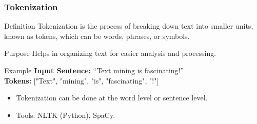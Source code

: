 \documentclass[aspectratio=169]{beamer}
\begin{document}
\begin{frame}[fragile]
    \frametitle{Tokenization}
    \begin{block}{Definition}
        Tokenization is the process of breaking down text into smaller units, known as tokens, which can be words, phrases, or symbols.
    \end{block}
    
    \begin{block}{Purpose}
        Helps in organizing text for easier analysis and processing.
    \end{block}
    
    \begin{block}{Example}
        \textbf{Input Sentence:} “Text mining is fascinating!” \\
        \textbf{Tokens:} ["Text", "mining", "is", "fascinating", "!"]
    \end{block}
    
    \begin{itemize}
        \item Tokenization can be done at the word level or sentence level.
        \item Tools: NLTK (Python), SpaCy.
    \end{itemize}
\end{frame}
\end{document}
